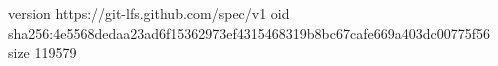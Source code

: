 version https://git-lfs.github.com/spec/v1
oid sha256:4e5568dedaa23ad6f15362973ef4315468319b8bc67cafe669a403dc00775f56
size 119579
